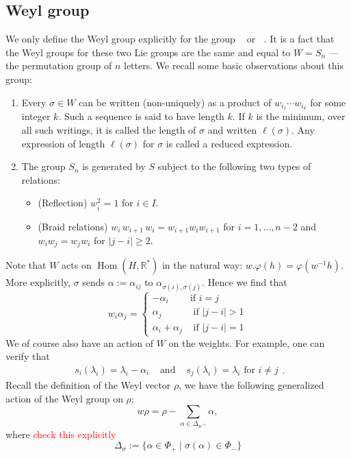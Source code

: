 \documentclass[12pt]{article} %
\DeclareMathOperator{\SLn}{\text{SL}_n(\mathbb{R})}
\DeclareMathOperator{\GLn}{\text{GL}_n(\mathbb{R})}
\DeclareMathOperator{\Hom}{Hom}
\begin{document}
\subsection{Weyl group}
We only define the Weyl group explicitly for the group $\SLn$ or $\GLn$. It is a fact that the Weyl groups for
these two Lie groups are the same and equal to $W = S_n$ — the permutation group of $n$ letters.  We recall some basic
observations about this group:
\begin{enumerate}
    \item Every $\sigma \in W$ can be written (non-uniquely) as a product of $w_{i_1} \cdots w_{i_k}$ for some integer $k$. Such a sequence is said to have length $k.$ If $k$ is the minimum, over all such writings, it is called the length of $\sigma$ and written $\ell(\sigma)$. Any expression of length $\ell(\sigma)$ for $\sigma$ is called a reduced expression.

    \item The group $S_n$ is generated by $S$ subject to the following two types of relations:
          \begin{itemize}
              \item (Reflection) $w_i^2=1$ for $i \in I$.
              \item (Braid relations) $w_i \, w_{i+1} \, w_i = w_{i+1}w_i w_{i+1}$ for $i = 1, \ldots, n-2$ and $w_i w_j = w_j w_i$ for $|j -i |\geq 2$.
          \end{itemize}
\end{enumerate}
Note that $W$ acts on $\Hom(H, \mathbb{R}^*)$ in the natural way: $w . \varphi(h) = \varphi(w^{-1} h)$. More explicitly,  $\sigma$ sends $\alpha:= \alpha_{ij}$ to $\alpha_{\sigma(i), \sigma(j)}$. Hence we find that
\[w_i \alpha_j = \begin{cases} - \alpha_i          & \mbox{if } i=j           \\
              \alpha_j            & \mbox{ if } |j - i | > 1 \\
              \alpha_i + \alpha_j & \mbox{ if } |j-i|=1\end{cases} \]
We of course also have an action of $W$ on the weights.  For example, one can verify that
\[ \begin{array}{lcr} s_i(\lambda_i) = \lambda_i - \alpha_i & \text{ and } & s_j(\lambda_i) = \lambda_i \mbox{ for } i \neq j \end{array}.\]
Recall the definition of the Weyl vector $\rho$, we have the following generalized action of the Weyl group on $\rho$:
\[ w \rho = \rho - \sum_{\alpha \in \Delta_{w^{-1}}} \alpha,\]
where \textcolor{red}{check this explicitly}
\[\Delta_{\sigma}:= \{ \alpha \in \Phi_+ \mid \sigma(\alpha) \in \Phi_- \}\]
\end{document}
